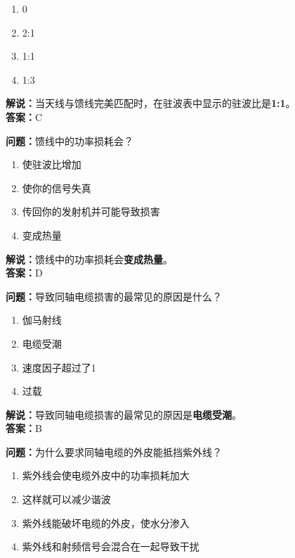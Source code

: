 \begin{enumerate}[label=\Alph*), leftmargin=1.5cm]
	\item 0
	\item 2:1
	\item 1:1
	\item 1:3
\end{enumerate}

\textbf{解说：}当天线与馈线完美匹配时，在驻波表中显示的驻波比是\textbf{1:1}。\\\textbf{答案：}C



\textbf{问题：}馈线中的功率损耗会？

\begin{enumerate}[label=\Alph*), leftmargin=1.5cm]
	\item 使驻波比增加
	\item 使你的信号失真
	\item 传回你的发射机并可能导致损害
	\item 变成热量
\end{enumerate}

\textbf{解说：}馈线中的功率损耗会\textbf{变成热量}。\\\textbf{答案：}D



\textbf{问题：}导致同轴电缆损害的最常见的原因是什么？

\begin{enumerate}[label=\Alph*), leftmargin=1.5cm]
	\item 伽马射线
	\item 电缆受潮
	\item 速度因子超过了1
	\item 过载
\end{enumerate}

\textbf{解说：}导致同轴电缆损害的最常见的原因是\textbf{电缆受潮}。\\\textbf{答案：}B



\textbf{问题：}为什么要求同轴电缆的外皮能抵挡紫外线？

\begin{enumerate}[label=\Alph*), leftmargin=1.5cm]
	
	\item 紫外线会使电缆外皮中的功率损耗加大
	\item 这样就可以减少谐波
	\item 紫外线能破坏电缆的外皮，使水分渗入
	\item 紫外线和射频信号会混合在一起导致干扰
\end{enumerate}

